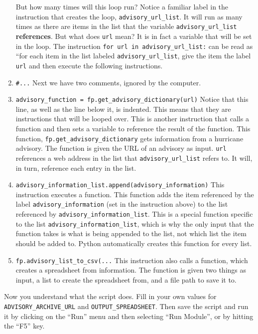 \documentclass{article}
\begin{document}
\begin{enumerate}
        But how many times will this loop run?  Notice a familiar label in the instruction that creates the loop, \verb+advisory_url_list+.  It will run as many times as there are items in the list that the variable \verb+advisory_url_list+ \textbf{references}.  But what does \verb+url+ mean?  It is in fact a variable that will be set in the loop.  The instruction \verb+for url in advisory_url_list:+ can be read as ``for each item in the list labeled \verb+advisory_url_list+, give the item the label \verb+url+ and then execute the following instructions.
    \item \verb+#...+ Next we have two comments, ignored by the computer.
    \item \verb+advisory_function = fp.get_advisory_dictionary(url)+ Notice that this line, as well as the line below it, is indented.  This means that they are instructions that will be looped over.  This is another instruction that calls a function and then sets a variable to reference the result of the function.  This function, \verb+fp.get_advisory_dictionary+ gets information from a hurricane advisory.  The function is given the URL of an advisory as input.  \verb+url+ references a web address in the list that  \verb+advisory_url_list+ refers to.  It will, in turn, reference each entry in the list.
    \item \verb+advisory_information_list.append(advisory_information)+ This instruction executes a function.  This function adds the item referenced by the label \verb+advisory_information+ (set in the instruction above) to the list referenced by \verb+advisory_information_list+.  This is a special function specific to the list \verb+advisory_information_list+, which is why the only input that the function takes is what is being appended to the list, not which list the item should be added to.  Python automatically creates this function for every list.
    \item \verb+fp.advisory_list_to_csv(...+ This instruction also calls a function, which creates a spreadsheet from information.  The function is given two things as input, a list to create the spreadsheet from, and a file path to save it to.
\end{enumerate}

Now you understand what the script does.  Fill in your own values for \verb+ADVISORY_ARCHIVE_URL+ and \verb+OUTPUT_SPREADSHEET+.  Then save the script and run it by clicking on the ``Run'' menu and then selecting ``Run Module'', or by hitting the ``F5'' key.
\end{document}
